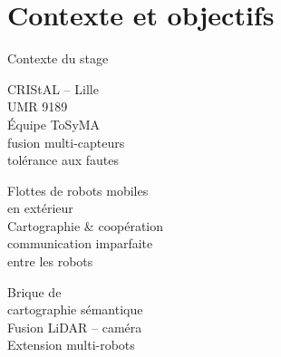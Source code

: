 \section{Contexte et objectifs}

\begin{frame}{Contexte du stage}
  \vfill
  \begin{tcbraster}[raster columns=3, raster equal height, raster column skip=0.45cm]
    \begin{tcolorbox}[carte, title=Laboratoire]
      \alert{CRIStAL} -- Lille\\
      {\footnotesize UMR 9189}\\[8pt]
      Équipe \alert{ToSyMA}\\
      {\footnotesize\color{textgray} fusion multi-capteurs\\ tolérance aux fautes}
    \end{tcolorbox}
    \begin{tcolorbox}[carte, title=Projet ANR-SOS]
      Flottes de \alert{robots mobiles}\\
      en \alert{extérieur}\\[8pt]
      Cartographie \& coopération\\
      {\footnotesize\color{textgray} communication imparfaite\\ entre les robots}
    \end{tcolorbox}
    \begin{tcolorbox}[carte, title=Mon stage]
      Brique de\\ \alert{cartographie sémantique}\\[8pt]
      Fusion \alert{LiDAR -- caméra}\\[4pt]
      Extension \alert{multi-robots}
    \end{tcolorbox}
  \end{tcbraster}
  \vfill
  \centering
\end{frame}

